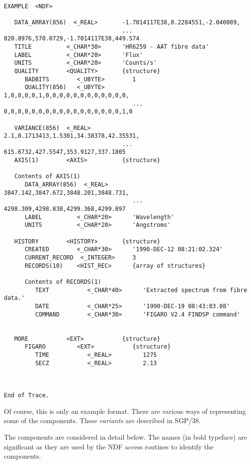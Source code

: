 \documentclass[twoside,11pt]{article}
\renewcommand{\_}{{\tt\char'137}}
\newcommand{\xref}[3]{#1}
\begin{document}
\begin{verbatim}

EXAMPLE  <NDF>

   DATA_ARRAY(856)  <_REAL>       -1.7014117E38,0.2284551,-2.040089,
                                  ... 820.8976,570.0729,-1.7014117E38,449.574
   TITLE          <_CHAR*30>      'HR6259 - AAT fibre data'
   LABEL          <_CHAR*20>      'Flux'
   UNITS          <_CHAR*20>      'Counts/s'
   QUALITY        <QUALITY>       {structure}
      BADBITS        <_UBYTE>        1
      QUALITY(856)   <_UBYTE>        1,0,0,0,0,1,0,0,0,0,0,0,0,0,0,0,0,0,
                                     ... 0,0,0,0,0,0,0,0,0,0,0,0,0,0,0,0,0,1,0

   VARIANCE(856)  <_REAL>         2.1,0.1713413,1.5301,34.38378,42.35531,
                                  ... 615.6732,427.5547,353.9127,337.1805
   AXIS(1)        <AXIS>          {structure}

   Contents of AXIS(1)
      DATA_ARRAY(856)  <_REAL>       3847.142,3847.672,3848.201,3848.731,
                                     ... 4298.309,4298.838,4299.368,4299.897
      LABEL          <_CHAR*20>      'Wavelength'
      UNITS          <_CHAR*20>      'Angstroms'

   HISTORY        <HISTORY>       {structure}
      CREATED        <_CHAR*30>      '1990-DEC-12 08:21:02.324'
      CURRENT_RECORD  <_INTEGER>     3
      RECORDS(10)    <HIST_REC>      {array of structures}

      Contents of RECORDS(1)
         TEXT           <_CHAR*40>      'Extracted spectrum from fibre data.'
         DATE           <_CHAR*25>      '1990-DEC-19 08:43:03.08'
         COMMAND        <_CHAR*30>      'FIGARO V2.4 FINDSP command'


   MORE           <EXT>           {structure}
      FIGARO         <EXT>           {structure}
         TIME           <_REAL>         1275
         SECZ           <_REAL>         2.13



End of Trace.
\end{verbatim}
\newpage

Of course, this is only an example format. There are various ways of 
representing some of the components. 
These {\sl variants\/} are described in \xref{SGP/38}{sgp38}{}.

The components are considered in detail below.
The names (in bold typeface) are significant as they are used by the NDF 
access routines to identify the components.
\end{document}
